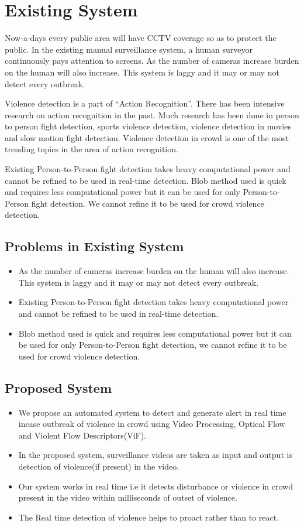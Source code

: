 \section{Existing System}
Now-a-days every public area will have CCTV coverage so as to protect the public. In the existing manual surveillance system, a human surveyor continuously pays attention to screens. As the number of cameras increase burden on the human will also increase. This system is laggy and it may or may not detect every outbreak. 
\par
Violence detection is a part of “Action Recognition”. There has been intensive research on action recognition in the past. Much research has been done in person to person fight detection, sports violence detection, violence detection in movies and slow motion fight detection. Violence detection in crowd is one of the most trending topics in the area of action recognition. 
\par
Existing Person-to-Person fight detection\cite{fight} takes heavy computational power and cannot be refined to be used in real-time detection. Blob method used is quick and requires less computational power but it can be used for only Person-to-Person fight detection. We cannot refine it to be used for crowd violence detection.
\subsection{Problems in Existing System}
\begin{itemize}
	\item As the number of cameras increase burden on the human will also increase. This system is laggy and it may or may not detect every outbreak.
	\item Existing Person-to-Person fight detection\cite{fight} takes heavy computational power and cannot be refined to be used in real-time detection.
	\item Blob method used is quick and requires less computational power but it can be used for only Person-to-Person fight detection, we cannot refine it to be used for crowd violence detection.
\end{itemize}
\subsection{Proposed System}
\begin{itemize}
  \item We propose an automated system to detect and generate alert in real time incase outbreak of violence in crowd using Video Processing, Optical Flow and Violent Flow Descriptors(ViF). 
  \item In the proposed system, surveillance videos are taken as input and output is detection of violence(if present) in the video.
  \item Our system works in real time i.e it detects disturbance or violence in crowd present in the video within milliseconds of outset of violence. 
  \item The Real time detection of violence helps to proact rather than to react.
\end{itemize}
